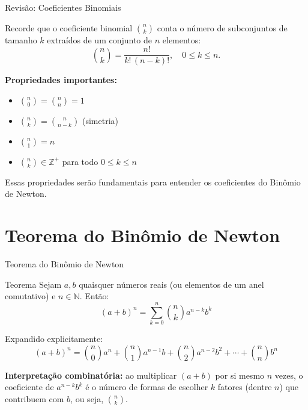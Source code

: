 \documentclass[9pt]{beamer}
\begin{document}
\begin{frame}{Revisão: Coeficientes Binomiais}

Recorde que o coeficiente binomial $\binom{n}{k}$ conta o número de subconjuntos de tamanho $k$ extraídos de um conjunto de $n$ elementos:
\[
\binom{n}{k} = \frac{n!}{k!\,(n-k)!}, \quad 0 \leq k \leq n.
\]

\vspace{0.3cm}

\textbf{Propriedades importantes:}
\begin{itemize}
    \item $\binom{n}{0} = \binom{n}{n} = 1$
    \item $\binom{n}{k} = \binom{n}{n-k}$ \quad (simetria)
    \item $\binom{n}{1} = n$
    \item $\binom{n}{k} \in \mathbb{Z}^+$ para todo $0 \leq k \leq n$
\end{itemize}

\vspace{0.3cm}

Essas propriedades serão fundamentais para entender os coeficientes do Binômio de Newton.
\end{frame}

\section{Teorema do Binômio de Newton}

\begin{frame}{Teorema do Binômio de Newton}

\begin{block}{Teorema}
Sejam $a, b$ quaisquer números reais (ou elementos de um anel comutativo) e $n \in \mathbb{N}$. Então:
\[
(a + b)^n = \sum_{k=0}^{n} \binom{n}{k} a^{n-k} b^{k}
\]
\end{block}

\vspace{0.4cm}

Expandido explicitamente:
\[
(a+b)^n = \binom{n}{0}a^n + \binom{n}{1}a^{n-1}b + \binom{n}{2}a^{n-2}b^2 + \cdots + \binom{n}{n}b^n
\]

\vspace{0.3cm}

\textbf{Interpretação combinatória:} ao multiplicar $(a+b)$ por si mesmo $n$ vezes, o coeficiente de $a^{n-k}b^k$ é o número de formas de escolher $k$ fatores (dentre $n$) que contribuem com $b$, ou seja, $\binom{n}{k}$.
\end{frame}
\end{document}
